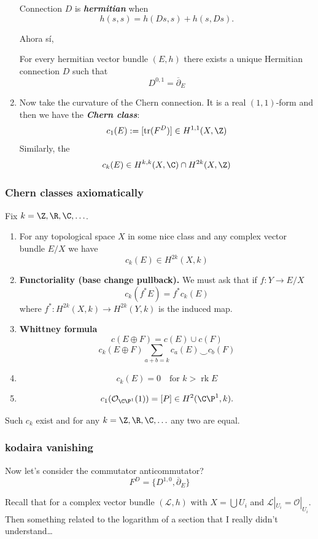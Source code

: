 \begin{enumerate}
\begin{defn}
		 Connection $D$ is \textit{\textbf{hermitian}} when
		\[h(s,s)=h(Ds,s)+h(s,Ds).\]
	 \end{defn}
	 Ahora s\'i,
	 \begin{thm}[Chern]
	 	For every hermitian vector bundle $(E,h)$ there exists a unique Hermitian connection $D$ such that
		\[D^{0,1}=\overline{\partial}_E\]
	 \end{thm}
 \item Now take the curvature of the Chern connection. It is a real $(1,1)$-form and then we have the \textit{\textbf{Chern class}}:
	 \[c_1(E):=[\operatorname{tr}(F^D)]\in H^{1,1}(X,\Z)\]Similarly, the
	 \[c_k(E)\in H^{k,k}(X,\C)\cap H^{2k}(X,\Z)\]
\end{enumerate}
\subsubsection{Chern classes axiomatically}\label{ssec:Chern classes axiomatically}
Fix $k=\Z,\R,\C,\ldots$.
\begin{enumerate}
	\item For any topological space $X$ in some nice class and any complex vector bundle $E/X$ we have
		\[c_k(E)\in H^{2k}(X,k)\]
\item \textbf{Functoriality (base change pullback).} We must ask that if $f:Y\to E/X$ 
\[c_k(f^*E)=f^*c_k(E)\]
where $f^*:H^{2k}(X,k)\to H^{2k}(Y,k)$ is the induced map.
\item \textbf{Whittney formula}\[c(E\oplus F)=c(E)\cup c(F)\]
	\[c_k(E\oplus F)\sum_{a+b=k} c_a(E)\smile c_b(F)\]
\item \[c_k(E)=0\quad \text{for } k>\operatorname{rk}E\]
\item \[c_1(\mathcal{O}_{\C\P^1}(1))=[P]\in H^{2}(\C\P^1,k).\]
\end{enumerate}
	
\begin{thm}
	Such $c_k$ exist and for any $k=\Z,\R,\C,\ldots$ any two are equal.
\end{thm}
\subsubsection{kodaira vanishing}\label{sec:kodaira-vanishing}
Now let's consider the commutator {\color{magenta}anticommutator?}
\[F^D=\{D^{1,0},\overline{\partial}_E\}\]
\begin{remark}
	Recall that for a complex vector bundle $(\mathcal{L},h)$ with $X=\bigcup U_i$ and $\mathcal{L}|_{U_i}=\mathcal{O}|_{U_i}$. {\color{magenta}Then something related to the logarithm of a section that I really didn't understand…}
\end{remark}

